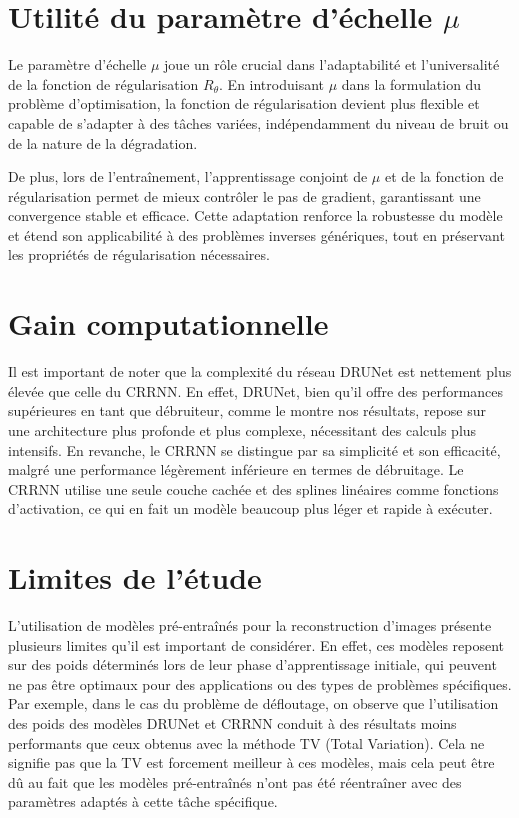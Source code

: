 \documentclass[a4paper, 12pt]{report} %
\begin{document}
\section*{Utilité du paramètre d’échelle $\mu$}
Le paramètre d'échelle $\mu$ joue un rôle crucial dans l'adaptabilité et l'universalité de la fonction de  régularisation $R_\theta$. En introduisant $\mu$ dans la formulation du problème d'optimisation, la fonction de  régularisation devient plus flexible et capable de s'adapter à des tâches variées, indépendamment du niveau de bruit ou de la nature de la dégradation.

De plus, lors de l'entraînement, l'apprentissage conjoint de $\mu$ et de la fonction de  régularisation permet de mieux contrôler le pas de gradient, garantissant une convergence stable et efficace. Cette adaptation renforce la robustesse du modèle et étend son applicabilité à des problèmes inverses génériques, tout en préservant les propriétés de régularisation nécessaires.

\section*{Gain computationnelle} 
Il est important de noter que la complexité du réseau DRUNet est nettement plus élevée que celle du CRRNN. En effet, DRUNet, bien qu'il offre des performances supérieures en tant que débruiteur, comme le montre nos résultats, repose sur une architecture plus profonde et plus complexe, nécessitant des calculs plus intensifs. En revanche, le CRRNN se distingue par sa simplicité et son efficacité, malgré une performance légèrement inférieure en termes de débruitage. Le CRRNN utilise une seule couche cachée et des splines linéaires comme fonctions d'activation, ce qui en fait un modèle beaucoup plus léger et rapide à exécuter.

\section*{Limites de l'étude}
L'utilisation de modèles pré-entraînés pour la reconstruction d'images présente plusieurs limites qu'il est important de considérer. En effet, ces modèles reposent sur des poids déterminés lors de leur phase d'apprentissage initiale, qui peuvent ne pas être optimaux pour des applications ou des types de problèmes spécifiques. Par exemple, dans le cas du problème de défloutage, on observe que l'utilisation des poids des modèles DRUNet et CRRNN conduit à des résultats moins performants que ceux obtenus avec la méthode TV (Total Variation). Cela ne signifie pas que la TV est forcement meilleur à ces modèles, mais cela peut être dû au fait que les modèles pré-entraînés n'ont pas été réentraîner avec des paramètres adaptés à cette tâche spécifique.
\end{document}
